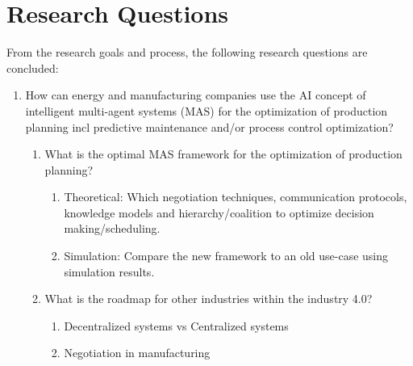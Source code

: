 \section{Research Questions}
From the research goals and process, the following research questions are concluded:
\begin{enumerate}
	\item
	How can energy and manufacturing companies use the AI concept of intelligent multi-agent systems (MAS) for the optimization of production planning incl predictive maintenance and/or process control optimization?
	\begin{enumerate}
		\item
		What is the optimal MAS framework for the optimization of production planning?
		\begin{enumerate}
			\item 
			Theoretical: Which negotiation techniques, communication protocols, knowledge models and hierarchy/coalition to optimize decision making/scheduling.
			\item
			Simulation: Compare the new framework to an old use-case using simulation results.
		\end{enumerate}
		\item
		What is the roadmap for other industries within the industry 4.0?
		\begin{enumerate}
			\item 
			Decentralized systems vs Centralized systems
			\item
			Negotiation in manufacturing
		\end{enumerate}
	\end{enumerate}
\end{enumerate}

